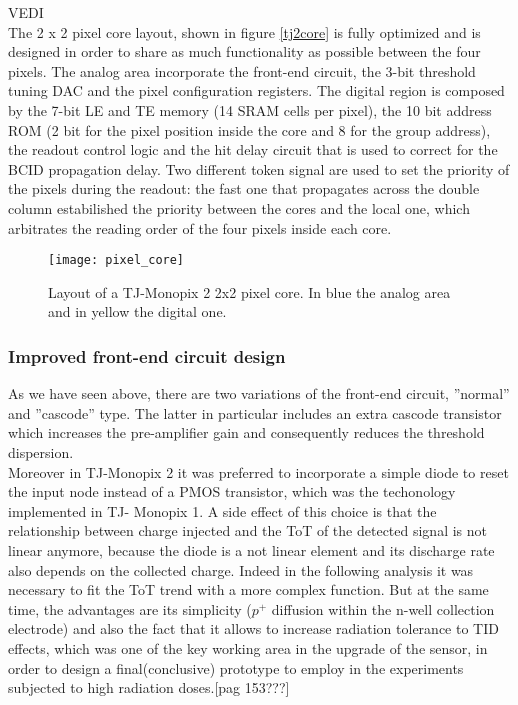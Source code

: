 VEDI\\ 

The 2 x 2 pixel core layout, shown in figure \vref{tj2core} is fully optimized and is designed in order to share as much functionality as possible between the four pixels. The analog area incorporate the front-end circuit, the 3-bit threshold tuning DAC and the pixel configuration registers. The digital region is composed by the 7-bit LE and TE memory (14 SRAM cells per pixel), the 10 bit address ROM (2 bit for the pixel position inside the core and 8 for the group address), the readout control logic and the hit delay circuit that is used to correct for the BCID propagation delay. Two different token signal are used to set the priority of the pixels during the readout: the fast one that propagates across the double column estabilished the priority between the cores and the local one, which arbitrates the reading order of the four pixels inside each core.

\begin{figure}[h!]
\centering
\texttt{[image: pixel\_core]}
\caption{Layout of a TJ-Monopix 2 2x2 pixel core. In blue the analog area and in yellow the digital one.}
\label{fig:tj2core}
\end{figure}



\subsubsection{Improved front-end circuit design}

As we have seen above, there are two variations of the front-end circuit,  ''normal'' and ''cascode'' type. The latter in particular includes an extra cascode transistor which increases the pre-amplifier gain and consequently reduces the threshold dispersion.\\
Moreover in TJ-Monopix 2 it was preferred to incorporate a simple diode to reset the input node instead of a PMOS transistor, which was the techonology implemented in TJ- Monopix 1. A side effect of this choice is that the relationship between charge injected and the ToT of the detected signal is not linear anymore, because the diode is a not linear element and its discharge rate also depends on the collected charge. Indeed in the following analysis it was necessary to fit the ToT trend with a more complex function. But at the same time, the advantages are its simplicity ($p^{+}$ diffusion within the n-well collection electrode) and also the fact that it allows to increase radiation tolerance to TID effects, which was one of the key working area in the upgrade of the sensor, in order to design a final(conclusive) prototype to employ in the experiments subjected to high radiation doses.[pag 153???] \\


